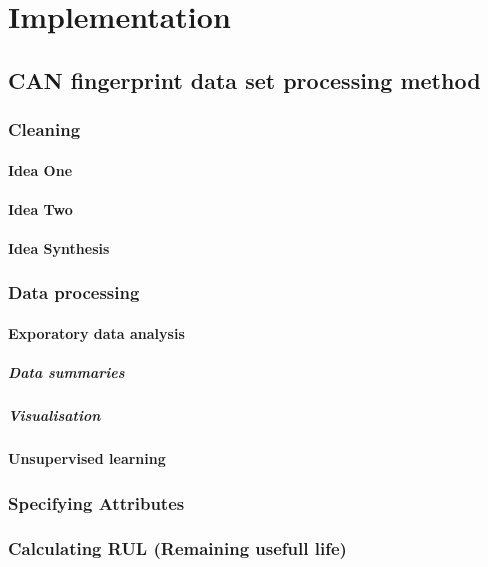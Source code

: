 \chapter{Implementation}
\section{CAN fingerprint data set processing method}
\subsection{Cleaning}
		\subsubsection{Idea One}
		\subsubsection{Idea Two}
		\subsubsection{Idea Synthesis}
\subsection{Data processing}
	\subsubsection{Exporatory data analysis}
		\paragraph{Data summaries}
		\paragraph{Visualisation}
	\subsubsection{Unsupervised learning}
\subsection{Specifying Attributes}
\subsection{Calculating RUL (Remaining usefull life)}
